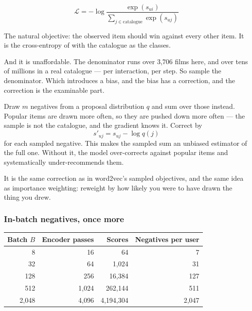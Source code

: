 \documentclass[11pt,a4paper]{article}
\begin{document}
\[
  \mathcal{L} = -\log
  \frac{\exp(s_{ui})}{\sum_{j\in\text{catalogue}} \exp(s_{uj})}
\]

The natural objective: the observed item should win against every other item.
It is the cross-entropy of  with the catalogue as the classes.

And it is unaffordable. The denominator runs over 3{,}706 films here, and over
tens of millions in a real catalogue --- per interaction, per step. So sample
the denominator. Which introduces a bias, and the bias has a correction, and
the correction is the examinable part.

\begin{derivbox}[title={Sampled softmax and the $\log q$ correction}]
Draw $m$ negatives from a proposal distribution $q$ and sum over those instead.
Popular items are drawn more often, so they are pushed down more often --- the
sample is not the catalogue, and the gradient knows it. Correct by
\[ s'_{uj} = s_{uj} - \log q(j) \]
for each sampled negative. This makes the sampled sum an unbiased estimator of
the full one. Without it, the model over-corrects against popular items and
systematically under-recommends them.

It is the same correction as in word2vec's sampled objectives, and the same
idea as importance weighting: reweight by how likely you were to have drawn the
thing you drew.
\end{derivbox}

\subsubsection{In-batch negatives, once more}

\begin{center}
\small
\begin{tabular}{rrrr}
\toprule
\textbf{Batch $B$} & \textbf{Encoder passes} & \textbf{Scores} &
\textbf{Negatives per user} \\
\midrule
8      & 16       & 64          & 7 \\
32     & 64       & 1{,}024     & 31 \\
128    & 256      & 16{,}384    & 127 \\
512    & 1{,}024  & 262{,}144   & 511 \\
2{,}048 & 4{,}096 & 4{,}194{,}304 & 2{,}047 \\
\bottomrule
\end{tabular}
\end{center}
\end{document}
